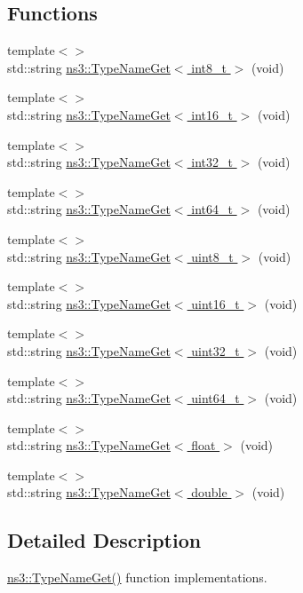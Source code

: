 \subsection*{Functions}
{\bf }\par
\begin{DoxyCompactItemize}
\item 
{\footnotesize template$<$$>$ }\\std\+::string \hyperlink{group__attributeimpl_gaf2000b8baeaaa56a818ea1b3e707542e}{ns3\+::\+Type\+Name\+Get$<$ int8\+\_\+t $>$} (void)
\item 
{\footnotesize template$<$$>$ }\\std\+::string \hyperlink{group__attributeimpl_gaa497aafbaa514d27fb1c8a44723eab25}{ns3\+::\+Type\+Name\+Get$<$ int16\+\_\+t $>$} (void)
\item 
{\footnotesize template$<$$>$ }\\std\+::string \hyperlink{group__attributeimpl_gaa80c01003e8f97a13ce91964d0657bf8}{ns3\+::\+Type\+Name\+Get$<$ int32\+\_\+t $>$} (void)
\item 
{\footnotesize template$<$$>$ }\\std\+::string \hyperlink{group__attributeimpl_gabce9a2b4cd9746a9f2367a15a2446fae}{ns3\+::\+Type\+Name\+Get$<$ int64\+\_\+t $>$} (void)
\item 
{\footnotesize template$<$$>$ }\\std\+::string \hyperlink{group__attributeimpl_ga5d93dfb7262b2958de81883d1289c2ee}{ns3\+::\+Type\+Name\+Get$<$ uint8\+\_\+t $>$} (void)
\item 
{\footnotesize template$<$$>$ }\\std\+::string \hyperlink{group__attributeimpl_gad3a57d52e5dc9eb143cf9365ba4a3654}{ns3\+::\+Type\+Name\+Get$<$ uint16\+\_\+t $>$} (void)
\item 
{\footnotesize template$<$$>$ }\\std\+::string \hyperlink{group__attributeimpl_ga43f5f8c28d59d17ce8cbb9aaef6440fb}{ns3\+::\+Type\+Name\+Get$<$ uint32\+\_\+t $>$} (void)
\item 
{\footnotesize template$<$$>$ }\\std\+::string \hyperlink{group__attributeimpl_ga25468dd5b76562e1b359af6342b78f59}{ns3\+::\+Type\+Name\+Get$<$ uint64\+\_\+t $>$} (void)
\item 
{\footnotesize template$<$$>$ }\\std\+::string \hyperlink{group__attributeimpl_ga3161e1f308c7602aa2787fcbbef096fe}{ns3\+::\+Type\+Name\+Get$<$ float $>$} (void)
\item 
{\footnotesize template$<$$>$ }\\std\+::string \hyperlink{group__attributeimpl_gacddf452951d93d7419c247082fc18764}{ns3\+::\+Type\+Name\+Get$<$ double $>$} (void)
\end{DoxyCompactItemize}



\subsection{Detailed Description}
\hyperlink{group__attributeimpl_gaa575643602994c3f6c7e580fcd5ef041}{ns3\+::\+Type\+Name\+Get()} function implementations. 